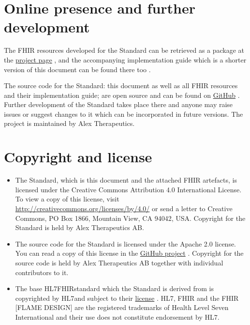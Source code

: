 \documentclass[12px]{report}
\newcommand{\fhir}{FHIR\textsuperscript{\textregistered}}
\newcommand{\hl}{HL7\textsuperscript{\textregistered}}
\begin{document}
\section{Online presence and further development}
The FHIR resources developed for the Standard can be retrieved as a package at the \href{https://simplifier.net/treat-nicotine-usage-diga}{project page} \cite{project}, 
and the accompanying implementation guide which is a shorter version of this document can be found there too \cite{ig}.

The source code for the Standard: this document as well as all FHIR resources and their implementation guide; are open source and can be 
found on \href{https://github.com/alex-therapeutics/diga-nicotine-usage-fhir}{GitHub} \cite{github}. Further development of the Standard
takes place there and anyone may raise issues or suggest changes to it which can be incorporated in future versions.
The project is maintained by Alex Therapeutics.

\section{Copyright and license}

\begin{itemize}
    \item The Standard, which is this document and the attached FHIR artefacts, is licensed under the Creative Commons Attribution 4.0 International License. 
To view a copy of this license, visit \href{http://creativecommons.org/licenses/by/4.0/}{http://creativecommons.org/licenses/by/4.0/} or send a letter to Creative Commons, PO Box 1866, Mountain View, CA 94042, USA.
Copyright for the Standard is held by Alex Therapeutics AB. 
    \item The source code for the Standard is licensed under the Apache 2.0 license. 
You can read a copy of this license in the \href{https://github.com/alex-therapeutics/diga-nicotine-usage-fhir/blob/main/LICENSE}{GitHub project} \cite{github}.
Copyright for the source code is held by Alex Therapeutics AB together with individual contributors to it.
    \item The base \hl \fhir standard which the Standard is derived from is copyrighted by \hl and subject to their \href{http://hl7.org/fhir/license.html}{license} \cite{fhirlic}.
HL7, FHIR and the FHIR [FLAME DESIGN] are the registered trademarks of Health Level Seven International and their use does not constitute endorsement by HL7.
\end{itemize}
\end{document}
